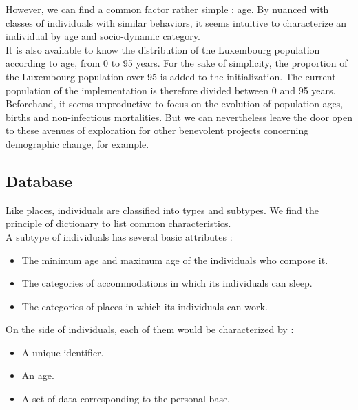 However, we can find a common factor rather simple : age. By nuanced with classes of individuals with similar behaviors, it seems intuitive to characterize an individual by age and socio-dynamic category.\\

It is also available to know the distribution of the Luxembourg population according to age, from 0 to 95 years. For the sake of simplicity, the proportion of the Luxembourg population over 95 is added to the initialization. The current population of the implementation is therefore divided between 0 and 95 years. Beforehand, it seems unproductive to focus on the evolution of population ages, births and non-infectious mortalities. But we can nevertheless leave the door open to these avenues of exploration for other benevolent projects concerning demographic change, for example.\\

\subsection{Database}

Like places, individuals are classified into types and subtypes. We find the principle of dictionary to list common characteristics.\\

A subtype of individuals has several basic attributes :\\

\begin{itemize}
\item  The minimum age and maximum age of the individuals who compose it.
\item The categories of accommodations in which its individuals can sleep.
\item The categories of places in which its individuals can work.\\
\end{itemize}

On the side of individuals, each of them would be characterized by :\\

\begin{itemize}
\item A unique identifier.
\item An age.
\item A set of data corresponding to the personal base.\\
\end{itemize}

